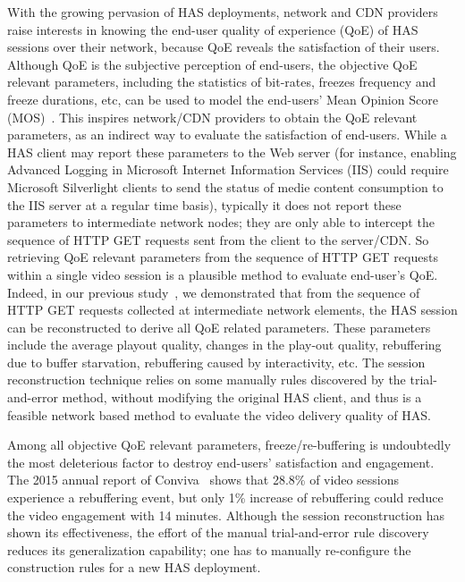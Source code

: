 \documentclass[journal]{IEEEtran}
\begin{document}
With the growing pervasion of HAS deployments, network and CDN providers raise interests in knowing the end-user quality of experience (QoE) of HAS sessions over their network, because QoE reveals the satisfaction of their users. Although QoE is the subjective perception of end-users, the objective QoE relevant parameters, including the statistics of bit-rates, freezes frequency and freeze durations, etc, can be used to model the end-users' Mean Opinion Score (MOS)~\cite{de2013model}. This inspires network/CDN providers to obtain the QoE relevant parameters, as an indirect way to evaluate the satisfaction of end-users. While a HAS client may report these parameters to the Web server (for instance, enabling Advanced Logging in Microsoft Internet Information Services (IIS) could require Microsoft Silverlight clients to send the status of medie content consumption to the IIS server at a regular time basis), typically it does not report these parameters to intermediate network nodes; they are only able to intercept the sequence of HTTP GET requests sent from the client to the server/CDN. So retrieving QoE relevant parameters from the sequence of HTTP GET requests within a single video session is a plausible method to evaluate end-user's QoE. 
Indeed, in our previous study~\cite{Huysegems:2012:SRH:2330748.2330763}, we demonstrated that from the sequence of HTTP GET requests collected at intermediate network elements, the HAS session can be reconstructed to derive all QoE related parameters. These parameters include the average playout quality, changes in the play-out quality, rebuffering due to buffer starvation, rebuffering caused by interactivity, etc. The session reconstruction technique relies on some manually rules discovered by the trial-and-error method, without modifying the original HAS client, and thus is a feasible network based method to evaluate the video delivery quality of HAS.

Among all objective QoE relevant parameters, freeze/re-buffering is undoubtedly the most deleterious factor to destroy end-users' satisfaction and engagement. The 2015 annual report of Conviva~\cite{convivaC:2015} shows that 28.8\% of video sessions experience a rebuffering event, but only 1\% increase of rebuffering could reduce the video engagement with 14 minutes. 
Although the session reconstruction has shown its effectiveness, the effort of the manual trial-and-error rule discovery reduces its generalization capability; one has to manually re-configure the construction rules for a new HAS deployment.  
\end{document}
